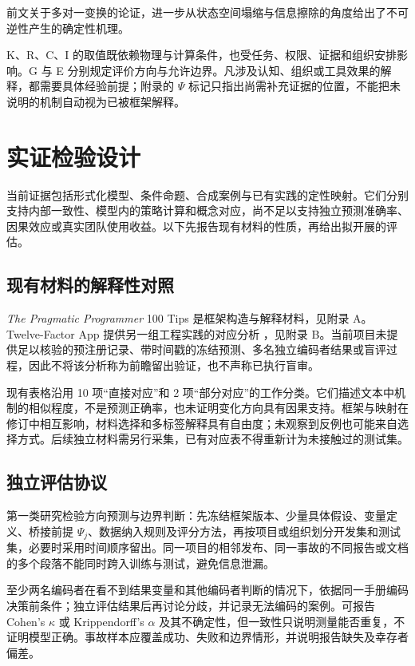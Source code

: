 \documentclass[11pt,a4paper]{ctexart}
\numberwithin{equation}{section}
\theoremstyle{definition}
\theoremstyle{plain}
\newcommand{\PP}{\textit{The Pragmatic Programmer}}
\begin{document}
前文关于多对一变换的论证，进一步从状态空间塌缩与信息擦除的角度给出了不可逆性产生的确定性机理。

K、R、C、I 的取值既依赖物理与计算条件，也受任务、权限、证据和组织安排影响。G 与 E 分别规定评价方向与允许边界。凡涉及认知、组织或工具效果的解释，都需要具体经验前提；附录的 $\Psi$ 标记只指出尚需补充证据的位置，不能把未说明的机制自动视为已被框架解释。

\section{实证检验设计}

当前证据包括形式化模型、条件命题、合成案例与已有实践的定性映射。它们分别支持内部一致性、模型内的策略计算和概念对应，尚不足以支持独立预测准确率、因果效应或真实团队使用收益。以下先报告现有材料的性质，再给出拟开展的评估。

\subsection{现有材料的解释性对照}

\PP{} 100 Tips 是框架构造与解释材料，见附录 A。Twelve-Factor App 提供另一组工程实践的对应分析 \cite{twelvefactor}，见附录 B。当前项目未提供足以核验的预注册记录、带时间戳的冻结预测、多名独立编码者结果或盲评过程，因此不将该分析称为前瞻留出验证，也不声称已执行盲审。

现有表格沿用 10 项“直接对应”和 2 项“部分对应”的工作分类。它们描述文本中机制的相似程度，不是预测正确率，也未证明变化方向具有因果支持。框架与映射在修订中相互影响，材料选择和多标签解释具有自由度；未观察到反例也可能来自选择方式。后续独立材料需另行采集，已有对应表不得重新计为未接触过的测试集。

\subsection{独立评估协议}

第一类研究检验方向预测与边界判断：先冻结框架版本、少量具体假设、变量定义、桥接前提 $\Psi_j$、数据纳入规则及评分方法，再按项目或组织划分开发集和测试集，必要时采用时间顺序留出。同一项目的相邻发布、同一事故的不同报告或文档的多个段落不能同时跨入训练与测试，避免信息泄漏。

至少两名编码者在看不到结果变量和其他编码者判断的情况下，依据同一手册编码决策前条件；独立评估结果后再讨论分歧，并记录无法编码的案例。可报告 Cohen's $\kappa$ 或 Krippendorff's $\alpha$ 及其不确定性，但一致性只说明测量能否重复，不证明模型正确。事故样本应覆盖成功、失败和边界情形，并说明报告缺失及幸存者偏差。
\end{document}
